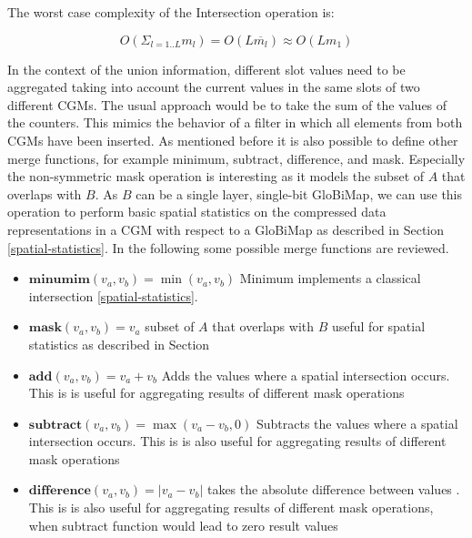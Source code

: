 \documentclass[sigconf]{acmart}
\begin{document}
The worst case complexity of the Intersection operation is:

$$O(\Sigma_{l = 1..L}{m_l}) = O(L \overline{m_l}) \approx O(L m_1)$$


In the context of the union information, different slot values need to be aggregated taking into account the current values in the same slots of two different CGMs. The usual approach would be to take the sum of the values of the counters. This mimics the behavior of a filter in which all elements from both CGMs have been inserted. As mentioned before it is also possible to define other merge functions, for example minimum, subtract, difference, and mask. Especially the non-symmetric mask operation is interesting as it models the subset of $A$ that overlaps with $B$. As $B$ can be a single layer, single-bit GloBiMap, we can use this operation to perform basic spatial statistics on the compressed data representations in a CGM with respect to a GloBiMap as described in Section \ref{spatial-statistics}.
In the following some possible merge functions are reviewed.
\begin{itemize}
  \item{$\textbf{minumim}(v_a, v_b) = \min(v_a, v_b)$ Minimum implements a classical intersection \ref{spatial-statistics}.}
  \item{$\textbf{mask}(v_a, v_b) = v_a$ subset of $A$ that overlaps with $B$ useful for spatial statistics as described in Section }
  \item{$\textbf{add}(v_a, v_b) = v_a + v_b$ Adds the values where a spatial intersection occurs. This is is useful for aggregating results of different mask operations}
  \item{$\textbf{subtract}(v_a, v_b) = \max(v_a - v_b, 0)$ Subtracts the values where a spatial intersection occurs. This is is also useful for aggregating results of different mask operations}
  \item{$\textbf{difference}(v_a, v_b) = |v_a - v_b|$ takes the absolute difference between values . This is is also useful for aggregating results of different mask operations, when subtract function would lead to zero result values}
\end{itemize}


\end{document}
